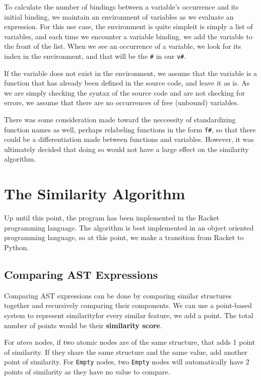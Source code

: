 \documentclass[12pt]{article}
\newcommand{\itm}[1]{\ensuremath{\mathit{#1}}}
\newcommand{\key}[1]{\texttt{#1}}
\newcommand{\Atm}[0]{\itm{atom}}
\begin{document}
\hfill

To calculate the number of bindings between a variable's occurrence and its initial binding, we maintain an environment of variables as we evaluate an expression. For this use case, the environment is quite simple\textemdash it is simply a list of variables, and each time we encounter a variable binding, we add the variable to the front of the list. When we see an occurrence of a variable, we look for its index in the environment, and that will be the \key{\#} in our \key{v\#}.

\hfill

If the variable does not exist in the environment, we assume that the variable is a function that has already been defined in the source code, and leave it as is. As we are simply checking the syntax of the source code and are not checking for errors, we assume that there are no occurrences of free (unbound) variables.

\hfill

There was some consideration made toward the neccessity of standardizing function names as well, perhaps relabeling functions in the form \key{f\#}, so that there could be a differentiation made between functions and variables. However, it was ultimately decided that doing so would not have a large effect on the similarity algorithm.

\section{The Similarity Algorithm}

Up until this point, the program has been implemented in the Racket programming language. The algorithm is best implemented in an object oriented programming language, so at this point, we make a transition from Racket to Python.

\subsection{Comparing AST Expressions}

Comparing AST expressions can be done by comparing similar structures together and recursively comparing their components. We can use a point-based system to represent similarity\textemdash for every similar feature, we add a point. The total number of points would be their \textbf{similarity score}.

\hfill

For \Atm{} nodes, if two atomic nodes are of the same structure, that adds 1 point of similarity. If they share the same structure and the same value, add another point of similarity. For \key{Empty} nodes, two \key{Empty} nodes will automatically have 2 points of similarity as they have no value to compare.
\end{document}
